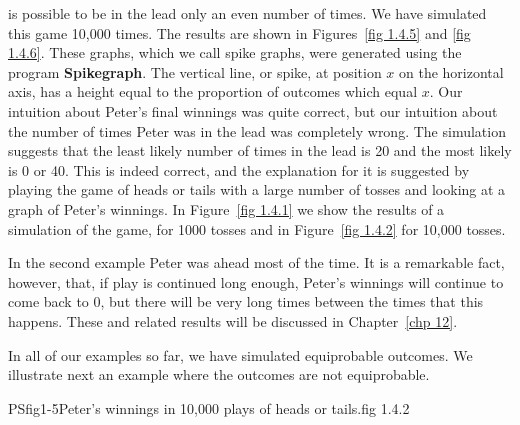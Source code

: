 \begin{example}
is possible to be in the lead only an even number of times.  We have simulated this 
game 10{,}000 times. 
The results are shown in Figures~\ref{fig 1.4.5} and \ref{fig 1.4.6}.  These graphs,
which we call spike graphs, were generated using the program {\bf Spikegraph}.
The vertical line, or spike, at position $x$ on the horizontal axis, has a height equal to the
proportion of outcomes which equal
$x$.  Our intuition about Peter's final winnings was quite correct, but our intuition
about the number of times Peter was in the lead was completely wrong.  The simulation
suggests that the least likely number of times in the lead is 20 and the most likely is 0
or 40.  This is indeed correct, and the explanation for it is suggested by playing the
game of heads or tails with a large number of tosses and looking at a graph of Peter's
winnings.  In Figure~\ref{fig 1.4.1} we show the results of a simulation of the game, for
1000 tosses and in Figure~\ref{fig 1.4.2} for 10{,}000 tosses.
\par
In the second example Peter was ahead most of the time.  It is a remarkable fact,
however, that, if play is continued long enough, Peter's winnings will continue
to come back to 0, but there will be very long times between the times that
this happens.  These and related results will be discussed in
Chapter~\ref{chp 12}.
\end{example}

In all of our examples so far, we have simulated equiprobable outcomes.  We
illustrate next an example where the outcomes are not equiprobable.




 {PSfig1-5}{Peter's winnings in 10,000 plays of heads or tails.}{fig 1.4.2}


